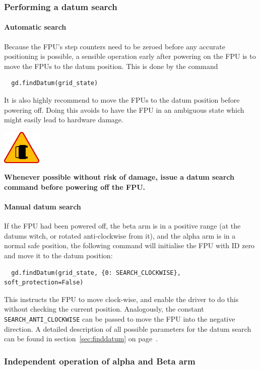 \documentclass[11pt,a4paper]{scrartcl}
\newenvironment{warning}{\begin{framed}\includegraphics[width=5em]{accident-area-ahead.png}
}{\end{framed}}
\begin{document}
\subsubsection{Performing a datum search}

\paragraph{Automatic search}

Because the FPU's step counters need to be zeroed
before any accurate positioning is possible, a
sensible operation early after powering on
the FPU is to move the FPUs to the datum position.
This is done by the command

\begin{verbatim}
  gd.findDatum(grid_state)
\end{verbatim}

It is also highly recommend to move the FPUs to the datum position
before powering off. Doing this avoids to have the FPU in an ambiguous
state which might easily lead to hardware damage.

\begin{warning}
  \textbf{Whenever possible without risk of damage, issue a datum
    search command before powering off the FPU.}
\end{warning}

\paragraph{Manual datum search}

If the FPU had been powered off, the beta arm is in a positive range
(at the datums witch, or rotated anti-clockwise from it), and the
alpha arm is in a normal safe position, the following command will
initialise the FPU with ID zero and move it to the datum position:
\begin{verbatim}
  gd.findDatum(grid_state, {0: SEARCH_CLOCKWISE}, soft_protection=False)
\end{verbatim}

This instructs the FPU to move clock-wise, and enable the driver to do
this without checking the current position. Analogously, the constant
\texttt{SEARCH\_ANTI\_CLOCKWISE} can be passed to move the FPU into
the negative direction. A detailed description of all possible
parameters for the datum search can be found in
section~\ref{sec:finddatum} on page~\pageref{sec:finddatum}.


\subsubsection{Independent operation of alpha and Beta arm}
\end{document}
